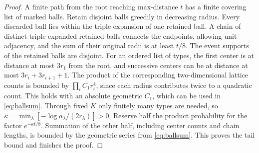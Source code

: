 \begin{proof}
A finite path from the root reaching max-distance \(t\) has a finite covering list of marked balls. Retain disjoint balls greedily in decreasing radius. Every discarded ball lies within the triple expansion of one retained ball. A chain of distinct triple-expanded retained balls connects the endpoints, allowing unit adjacency, and the sum of their original radii is at least \(t/8\). The event supports of the retained balls are disjoint. For an ordered list of types, the first center is at distance at most \(3r_1\) from the root, and successive centers can be at distance at most \(3r_i+3r_{i+1}+1\). The product of the corresponding two-dimensional lattice counts is bounded by \(\prod_i C_1r_i^4\), since each radius contributes twice to a quadratic count. This holds with an absolute geometric \(C_1\), which can be used in \eqref{eq:ballsum}. Through fixed \(K\) only finitely many types are needed, so \(\kappa=\min_\lambda[-\log a_\lambda/(2r_\lambda)]>0\). Reserve half the product probability for the factor \(e^{-\kappa t/8}\). Summation of the other half, including center counts and chain lengths, is bounded by the geometric series from \eqref{eq:ballsum}. This proves the tail bound and finishes the proof.
\end{proof}
